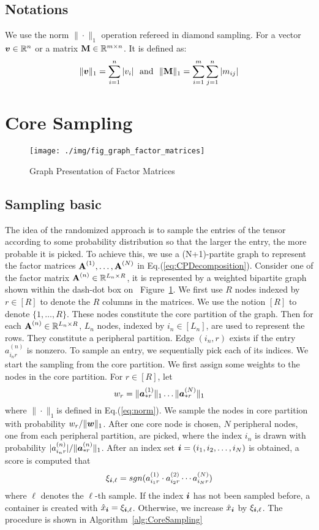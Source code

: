 \documentclass[letterpaper]{article}
\newcommand{\Sca}[3]{{#1}^{(#2)}_{i_#2#3}}%
\newcommand{\anr}[2]{\Sca{a}{#1}{#2}}
\newcommand{\score}[1]{\xi_{\V{i},#1}}
\newcommand{\V}[1]{{\boldsymbol{{\MakeLowercase{#1}}}}}
\newcommand{\ColVec}[3]{\V{#1}^{(#2)}_{#3}}
\newcommand{\NormColA}[2]{\norm{\ColVec{a}{#1}{*#2}}{1}}
\newcommand{\ColVecA}[1]{\V{a}^{(#1)}_{*r}}
\newcommand{\coord}{(i_1,i_2,\ldots,i_N)}
\newcommand{\WeightR}{\NormColA{1}{r}\ldots\NormColA{N}{r}}
\newcommand{\predx}{\hat{x}_{\V{i}}}
\newcommand{\M}[1]{{\textbf{{\MakeUppercase{#1}}}}}
\newcommand{\FacMat}[2]{\M{#1}^{(#2)}}
\newcommand{\norm}[2]{\|#1\|_{#2}}
\newcommand{\Eqn}[1]{Eq.(\ref{eq:#1})}
\newcommand{\Fig}[1]{Figure~\ref{fig:#1}}
\newcommand{\Alg}[1]{Algorithm~\ref{alg:#1}}
\begin{document}
\subsection{Notations}

We use the norm $\norm{\cdot}{1}$ operation refereed in diamond sampling.
For a vector $\V{v}\in \mathbb{R}^n$ or a matrix $\M{M}\in \mathbb{R}^{m\times n}$.
It is defined as:
\begin{align}
    \label{eq:norm}
    \norm{\V{v}}{1} = \sum_{i=1}^{n}|v_i|
    \ \  {\rm and} \ \
    \norm{\M{M}}{1} = \sum_{i=1}^{m}\sum_{j=1}^{n}|m_{ij}|
\end{align}


\section{Core Sampling}
\begin{figure}[t]
  \centering
  \texttt{[image: ./img/fig\_graph\_factor\_matrices]}\\
  \caption{Graph Presentation of Factor Matrices}
  \label{fig:GraphMatrices}
\end{figure}
\subsection{Sampling basic}
The idea of the randomized approach is 
to sample the entries of the tensor according to some probability distribution 
so that the larger the entry, the more probable it is picked. 
To achieve this, we use a (N+1)-partite graph to represent the factor matrices
$\FacMat{A}{1},\ldots,\FacMat{A}{N}$ in \Eqn{CPDecomposition}.
Consider one of the factor matrix $\FacMat{A}{n}\in \mathbb{R}^{L_n \times R}$,
it is represented by a weighted bipartite graph shown within the dash-dot box on ~\Fig{GraphMatrices}.
We first use $R$ nodes indexed by $r\in[R]$ to denote the $R$ columns in the matrices. 
We use the notion $[R]$ to denote $\{1,\ldots,R\}$. 
These nodes constitute the core partition of the graph. 
Then for each $\FacMat{A}{n}\in\mathbb{R}^{L_n\times R}$, $L_n$ nodes, 
indexed by $i_n\in[L_n]$, are used to represent the rows. 
They constitute a peripheral partition. 
Edge $(i_n,r)$ exists if the entry $\anr{n}{r}$ is nonzero.
To sample an entry, we sequentially pick each of its indices. 
We start the sampling from the core partition. 
We first assign some weights to the nodes in the core partition. 
For $r\in[R]$, let
\[
    w_r = \WeightR
\]
where $\norm{\cdot}{1}$is defined in \Eqn{norm}. 
We sample the nodes in core partition with probability $w_r/\norm{\V{W}}{1}$. 
After one core node is chosen, 
$N$ peripheral nodes, one from each peripheral partition, are picked, 
where the index $i_n$ is drawn with probability $|\anr{n}{r}|/\norm{\ColVecA{n}}{1}$. 
After an index set $\V{i}=\coord$ is obtained, 
a score is computed that
\[
\score{\ell}  = sgn(\anr{1}{r}\cdot\anr{2}{r}\cdots\anr{N}{r})
\]
where $\ell$ denotes the $\ell$-th sample. 
If the index $\V{i}$ has not been sampled before, 
a container is created with $\predx = \score{\ell}$. 
Otherwise, we increase $\predx$ by $\score{\ell}$. 
The procedure is shown in \Alg{CoreSampling}
\end{document}

